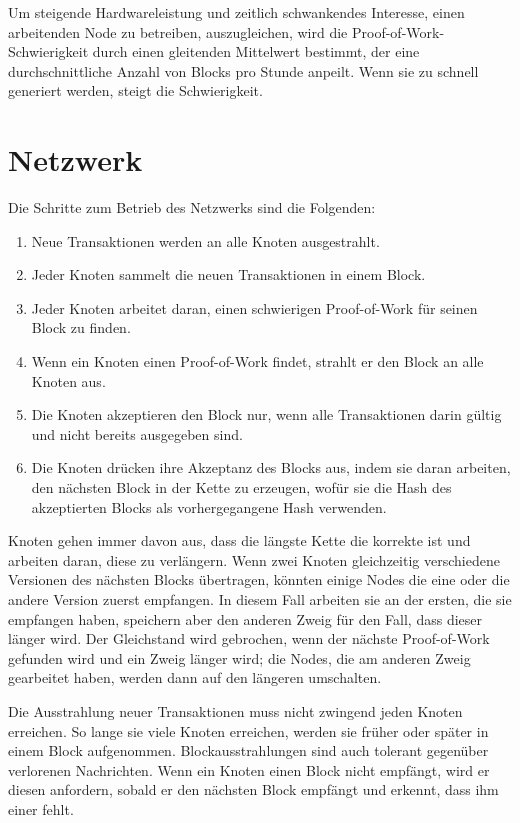\documentclass[10pt]{article}
\begin{document}
	Um steigende Hardwareleistung und zeitlich schwankendes Interesse, einen arbeitenden Node zu betreiben, auszugleichen, wird die Proof-of-Work-Schwierigkeit durch einen gleitenden Mittelwert bestimmt, der eine durchschnittliche Anzahl von Blocks pro Stunde anpeilt. Wenn sie zu schnell generiert werden, steigt die Schwierigkeit.
	
	\section{Netzwerk}
	
	Die Schritte zum Betrieb des Netzwerks sind die Folgenden:
	
	\begin{enumerate}[label={\arabic*)}, topsep=0pt, itemsep=-1ex, partopsep=1ex, parsep=1ex]
		\item Neue Transaktionen werden an alle Knoten ausgestrahlt.
		\item Jeder Knoten sammelt die neuen Transaktionen in einem Block.
		\item Jeder Knoten arbeitet daran, einen schwierigen Proof-of-Work für seinen Block zu finden.
		\item Wenn ein Knoten einen Proof-of-Work findet, strahlt er den Block an alle Knoten aus.
		\item Die Knoten akzeptieren den Block nur, wenn alle Transaktionen darin gültig und nicht bereits ausgegeben sind.
		\item Die Knoten drücken ihre Akzeptanz des Blocks aus, indem sie daran arbeiten, den nächsten Block in der Kette zu erzeugen, wofür sie die Hash des akzeptierten Blocks als vorhergegangene Hash verwenden.
	\end{enumerate}
	
	Knoten gehen immer davon aus, dass die längste Kette die korrekte ist und arbeiten daran, diese zu verlängern. Wenn zwei Knoten gleichzeitig verschiedene Versionen des nächsten Blocks übertragen, könnten einige Nodes die eine oder die andere Version zuerst empfangen. In diesem Fall arbeiten sie an der ersten, die sie empfangen haben, speichern aber den anderen Zweig für den Fall, dass dieser länger wird. Der Gleichstand wird gebrochen, wenn der nächste Proof-of-Work gefunden wird und ein Zweig länger wird; die Nodes, die am anderen Zweig gearbeitet haben, werden dann auf den längeren umschalten.

	\newpage
	
	Die Ausstrahlung neuer Transaktionen muss nicht zwingend jeden Knoten erreichen. So lange sie viele Knoten erreichen, werden sie früher oder später in einem Block aufgenommen. Blockausstrahlungen sind auch tolerant gegenüber verlorenen Nachrichten. Wenn ein Knoten einen Block nicht empfängt, wird er diesen anfordern, sobald er den nächsten Block empfängt und erkennt, dass ihm einer fehlt.
	
\end{document}
